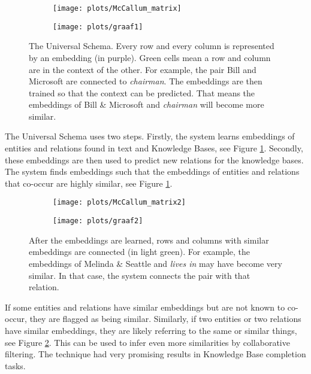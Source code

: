 \documentclass{article}
\begin{document}
 \begin{figure}[H]
 \begin{subfigure}{.475\textwidth}
 \texttt{[image: plots/McCallum\_matrix]}
 \end{subfigure}
 \begin{subfigure}{0.475\textwidth}
 \texttt{[image: plots/graaf1]}
 \end{subfigure}
 \caption[Universal Schema]{The Universal Schema. Every row and every column is represented by an embedding (in purple). Green cells mean a row and column are in the context of the other. For example, the pair Bill and Microsoft are connected to \emph{chairman}.
 The embeddings are then trained so that the context can be predicted. That means the embeddings of Bill \& Microsoft and \emph{chairman} will become more similar.}
 \label{McCallum_matrix}
 \end{figure}

The Universal Schema uses two steps. Firstly, the system learns embeddings of entities and relations found in text and Knowledge Bases\cite{univeralschema}, see Figure \ref{McCallum_matrix}. Secondly, these embeddings are then used to predict new relations for the knowledge bases. The system finds embeddings such that the embeddings of entities and relations that co-occur are highly similar, see Figure \ref{McCallum_matrix}.

 \begin{figure}[H]
 \begin{subfigure}{0.475\textwidth}
 \texttt{[image: plots/McCallum\_matrix2]}
 \end{subfigure}
 \begin{subfigure}{0.475\textwidth}
 \texttt{[image: plots/graaf2]}
 \end{subfigure}
 \caption[Universal Schema predictions]{After the embeddings are learned, rows and columns with similar embeddings are connected (in light green).
 For example, the embeddings of Melinda \& Seattle and \emph{lives in} may have become very similar. In that case, the system connects the pair with that relation.}
 \label{McCallum_matrix2}
 \end{figure}
 
 If some entities and relations have similar embeddings but are not known to co-occur, they are flagged as being similar. Similarly, if two entities or two relations have similar embeddings, they are likely referring to the same or similar things, see Figure \ref{McCallum_matrix2}. This can be used to infer even more similarities by collaborative filtering. The technique had very promising results in Knowledge Base completion tasks.
  
\end{document}

